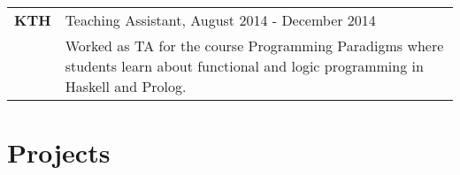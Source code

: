 \documentclass[a4paper,10pt]{article} %
\begin{document}
\begin{tabular}{lp{13cm}}
 
 \textbf{KTH} & Teaching Assistant, August 2014 - December 2014\\
 & \small{Worked as TA for the course Programming Paradigms where students learn about functional and logic programming in Haskell and Prolog. }  
 
\end{tabular}



\section{Projects}
\end{document}
